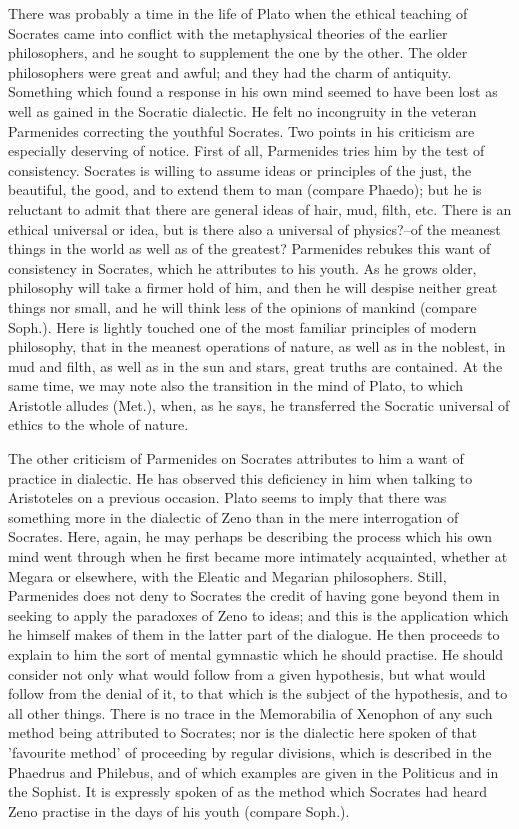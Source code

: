 There was probably a time in the life of Plato when the ethical teaching
of Socrates came into conflict with the metaphysical theories of the
earlier philosophers, and he sought to supplement the one by the other.
The older philosophers were great and awful; and they had the charm of
antiquity. Something which found a response in his own mind seemed to
have been lost as well as gained in the Socratic dialectic. He felt no
incongruity in the veteran Parmenides correcting the youthful Socrates.
Two points in his criticism are especially deserving of notice. First
of all, Parmenides tries him by the test of consistency. Socrates is
willing to assume ideas or principles of the just, the beautiful, the
good, and to extend them to man (compare Phaedo); but he is reluctant to
admit that there are general ideas of hair, mud, filth, etc. There is an
ethical universal or idea, but is there also a universal of physics?--of
the meanest things in the world as well as of the greatest? Parmenides
rebukes this want of consistency in Socrates, which he attributes to his
youth. As he grows older, philosophy will take a firmer hold of him, and
then he will despise neither great things nor small, and he will think
less of the opinions of mankind (compare Soph.). Here is lightly touched
one of the most familiar principles of modern philosophy, that in the
meanest operations of nature, as well as in the noblest, in mud and
filth, as well as in the sun and stars, great truths are contained. At
the same time, we may note also the transition in the mind of Plato,
to which Aristotle alludes (Met.), when, as he says, he transferred the
Socratic universal of ethics to the whole of nature.

The other criticism of Parmenides on Socrates attributes to him a want
of practice in dialectic. He has observed this deficiency in him when
talking to Aristoteles on a previous occasion. Plato seems to imply
that there was something more in the dialectic of Zeno than in the mere
interrogation of Socrates. Here, again, he may perhaps be describing
the process which his own mind went through when he first became more
intimately acquainted, whether at Megara or elsewhere, with the Eleatic
and Megarian philosophers. Still, Parmenides does not deny to Socrates
the credit of having gone beyond them in seeking to apply the paradoxes
of Zeno to ideas; and this is the application which he himself makes of
them in the latter part of the dialogue. He then proceeds to explain
to him the sort of mental gymnastic which he should practise. He should
consider not only what would follow from a given hypothesis, but what
would follow from the denial of it, to that which is the subject of
the hypothesis, and to all other things. There is no trace in the
Memorabilia of Xenophon of any such method being attributed to
Socrates; nor is the dialectic here spoken of that 'favourite method' of
proceeding by regular divisions, which is described in the Phaedrus and
Philebus, and of which examples are given in the Politicus and in the
Sophist. It is expressly spoken of as the method which Socrates had
heard Zeno practise in the days of his youth (compare Soph.).

